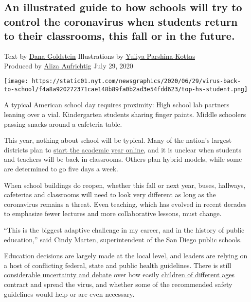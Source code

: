 \hypertarget{an-illustrated-guide-to-how-schools-will-try-to-control-the-coronavirus-when-students-return-to-their-classrooms-this-fall-or-in-the-future}{%
\subsection{An illustrated guide to how schools will try to control the
coronavirus when students return to their classrooms, this fall or in
the
future.}\label{an-illustrated-guide-to-how-schools-will-try-to-control-the-coronavirus-when-students-return-to-their-classrooms-this-fall-or-in-the-future}}

Text by \href{https://www.nytimes.com/by/dana-goldstein}{Dana Goldstein}
Illustrations by
\href{https://www.nytimes.com/by/yuliya-parshina-kottas}{Yuliya
Parshina-Kottas}\\
Produced by \href{https://www.nytimes.com/by/aliza-aufrichtig}{Aliza
Aufrichtig} July 29, 2020

\texttt{[image: https://static01.nyt.com/newsgraphics/2020/06/29/virus-back-to-school/f4a8a920272371cae148b89fa0b2ad3e54fdd623/top-hs-student.png]}

A typical American school day requires proximity: High school lab
partners leaning over a vial. Kindergarten students sharing finger
paints. Middle schoolers passing snacks around a cafeteria table.

This year, nothing about school will be typical. Many of the nation's
largest districts plan to
\href{https://www.nytimes.com/2020/07/14/us/coronavirus-schools-fall.html}{start
the academic year online}, and it is unclear when students and teachers
will be back in classrooms. Others plan hybrid models, while some are
determined to go five days a week.

When school buildings do reopen, whether this fall or next year, buses,
hallways, cafeterias and classrooms will need to look very different as
long as the coronavirus remains a threat. Even teaching, which has
evolved in recent decades to emphasize fewer lectures and more
collaborative lessons, must change.

``This is the biggest adaptive challenge in my career, and in the
history of public education,'' said Cindy Marten, superintendent of the
San Diego public schools.

Education decisions are largely made at the local level, and leaders are
relying on a host of conflicting federal, state and public health
guidelines. There is still
\href{https://www.nytimes.com/2020/07/11/health/coronavirus-schools-reopen.html}{considerable
uncertainty and debate} over how easily
\href{https://www.nytimes.com/2020/07/18/health/coronavirus-children-schools.html}{children
of different ages} contract and spread the virus, and whether some of
the recommended safety guidelines would help or are even necessary.

